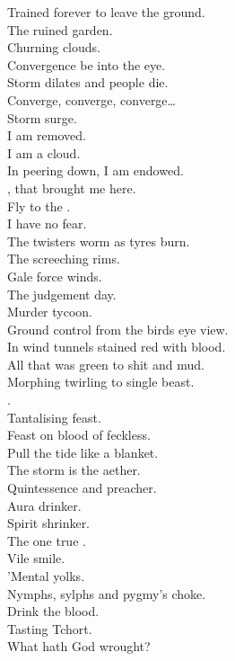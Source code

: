 Trained forever to leave the ground. \\
The ruined garden. \\
Churning clouds. \\
Convergence be into the eye. \\
Storm dilates and people die. \\

Converge, converge, converge… \\
Storm surge. \\

I am removed. \\
I am a cloud. \\
In peering down, I am endowed. \\
, that brought me here. \\
Fly to the . \\
I have no fear. \\

The twisters worm as tyres burn. \\
The screeching rims. \\
Gale force winds. \\
The judgement day. \\
Murder tycoon. \\
Ground control from the birds eye view. \\

In wind tunnels stained red with blood. \\
All that was green to shit and mud. \\

Morphing twirling to single beast. \\
. \\
Tantalising feast. \\

Feast on blood of feckless. \\
Pull the tide like a blanket. \\

The storm is the aether. \\
Quintessence and preacher. \\
Aura drinker. \\
Spirit shrinker. \\
The one true . \\
Vile smile. \\
'Mental yolks. \\
Nymphs, sylphs and pygmy's choke. \\
Drink the blood. \\
Tasting Tchort. \\
What hath God wrought? \\

